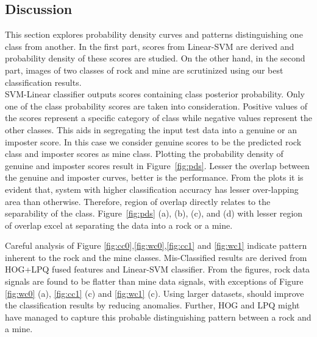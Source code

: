 \documentclass[english, 12pt]{article}
\begin{document}
\subsection{Discussion}
\tab This section explores probability density curves and patterns distinguishing one class from another. In the first part, scores from Linear-SVM are derived and probability density of these scores are studied. On the other hand, in the second part, images of two classes of rock and mine are scrutinized using our best classification results. 
\\
\tab SVM-Linear classifier outputs scores containing class posterior probability. Only one of the class probability scores are taken into consideration. Positive values of the scores represent a specific category of class while negative values represent the other classes. This aids in segregating the input test data into a genuine or an imposter score. In this case we consider genuine scores to be the predicted rock class and imposter scores as mine class. Plotting the probability density of genuine and imposter scores result in Figure~\ref{fig:pds}. Lesser the overlap between the genuine and imposter curves, better is the performance. From the plots it is evident that, system with higher classification accuracy has lesser over-lapping area than otherwise. Therefore, region of overlap directly relates to the separability of the class. Figure~\ref{fig:pds} (a), (b), (c), and (d) with lesser region of overlap excel at separating the data into a rock or a mine. 

\tab Careful analysis of Figure \ref{fig:cc0},\ref{fig:wc0},\ref{fig:cc1} and \ref{fig:wc1} indicate pattern inherent to the rock and the mine classes. Mis-Classified results are derived from HOG+LPQ fused features and Linear-SVM classifier. From the figures, rock data signals are found to be flatter than mine data signals, with exceptions of Figure \ref{fig:wc0} (a), \ref{fig:cc1} (c) and \ref{fig:wc1} (c). Using larger datasets, should improve the classification results by reducing anomalies. Further, HOG and LPQ might have managed to capture this probable distinguishing pattern between a rock and a mine.

\end{document}
